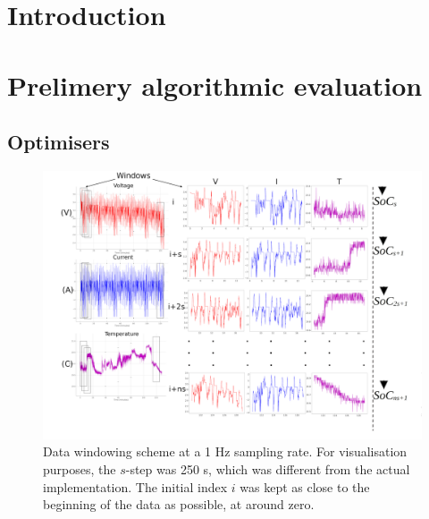 \documentclass[energies,article,accept,pdftex,moreauthors]{Definitions/mdpi}
\begin{document}
\section{Introduction} \label{sec:Introduction}

\section{Prelimery algorithmic evaluation} \label{sec:Body}

    
    
    \subsection{Optimisers} \label{subsec:optimisers}
    
        
        
        
    
\startlandscape
    \begin{figure}[H]
        \centering
        \includegraphics[width=20cm]{II_Body/images/windowing3f-A3.jpg}
        \caption{Data windowing scheme at a 1 Hz sampling rate. For visualisation purposes, the $s$-step was 250 s, which was different from the actual implementation. The initial index $i$ was kept as close to the beginning of the data as possible, at around zero.}
        \label{fig:Windowing3f}
    \end{figure}
\finishlandscape
\end{document}
